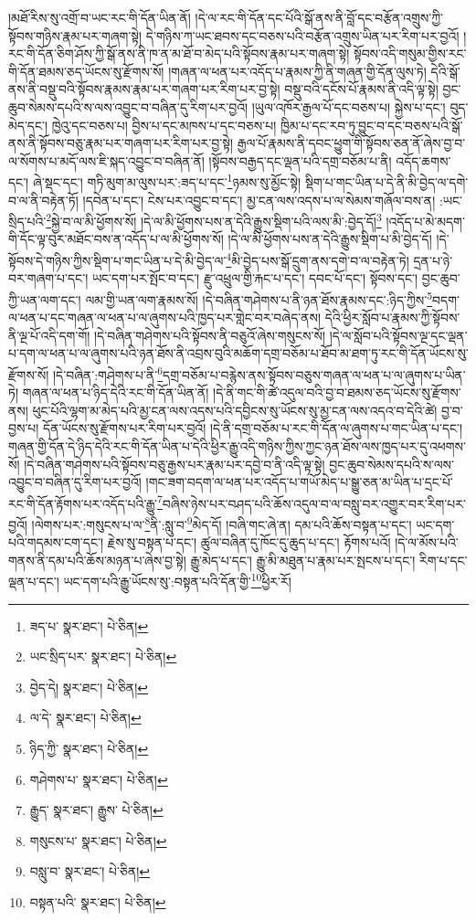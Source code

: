 །མཐོ་རིས་སུ་འགྲོ་བ་ཡང་རང་གི་དོན་ཡིན་ནོ། །དེ་ལ་རང་གི་དོན་དང་པོའི་སྒོ་ནས་ནི་བློ་དང་བརྩོན་འགྲུས་ཀྱི་སྟོབས་གཉིས་རྣམ་པར་གཞག་སྟེ། དེ་གཉིས་ཀ་ཡང་ཐབས་དང་བཅས་པའི་བརྩོན་འགྲུས་ཡིན་པར་རིག་པར་བྱའོ། །རང་གི་དོན་ཅིག་ཤོས་ཀྱི་སྒོ་ནས་ནི་ཁ་ན་མ་ཐོ་བ་མེད་པའི་སྟོབས་རྣམ་པར་གཞག་སྟེ། སྟོབས་འདི་གསུམ་གྱིས་རང་གི་དོན་ཐམས་ཅད་ཡོངས་སུ་རྫོགས་སོ། །གཞན་ལ་ཕན་པར་འདོད་པ་རྣམས་ཀྱི་ནི་གཞན་གྱི་དོན་ལུས་ཏེ། དེའི་སྒོ་ནས་ནི་བསྡུ་བའི་སྟོབས་རྣམས་རྣམ་པར་གཞག་པར་རིག་པར་བྱ་སྟེ། བསྡུ་བའི་དངོས་པོ་རྣམས་ནི་འདི་ལྟ་སྟེ། བྱང་ཆུབ་སེམས་དཔའི་ས་ལས་འབྱུང་བ་བཞིན་དུ་རིག་པར་བྱའོ། །ཡུལ་འཁོར་རྒྱལ་པོ་དང་བཅས་པ། སྐྱེས་པ་དང་། བུད་མེད་དང་། ཁྱེའུ་དང་བཅས་པ། བྱིས་པ་དང་མཁས་པ་དང་བཅས་པ། ཁྱིམ་པ་དང་རབ་ཏུ་བྱུང་བ་དང་བཅས་པའི་སྒོ་ནས་ནི་སྟོབས་བཅུ་རྣམ་པར་གཞག་པར་རིག་པར་བྱ་སྟེ། རྒྱལ་པོ་རྣམས་ནི་དབང་ཕྱུག་གི་སྟོབས་ཅན་ནོ་ཞེས་བྱ་བ་ལ་སོགས་པ་མདོ་ལས་ཇི་སྐད་འབྱུང་བ་བཞིན་ནོ། །སྟོབས་བརྒྱད་དང་ལྡན་པའི་དགྲ་བཅོམ་པ་ནི། འདོད་ཆགས་དང་། ཞེ་སྡང་དང་། གཏི་མུག་མ་ལུས་པར་:ཟད་པ་དང་\footnote{ཟད་པ་  སྣར་ཐང་།  པེ་ཅིན། }ཉམས་སུ་མྱོང་སྟེ། སྡིག་པ་གང་ཡིན་པ་དེ་ནི་མི་བྱེད་ལ་དགེ་བ་ལ་ནི་བརྟེན་ཏོ། །དབེན་པ་དང་། ངེས་པར་འབྱུང་བ་དང་། མྱ་ངན་ལས་འདས་པ་ལ་སེམས་གཞོལ་བས་ན། :ཡང་སྲིད་པའི་\footnote{ཡང་སྲིད་པར་  སྣར་ཐང་།  པེ་ཅིན། }སྐྱེ་བ་ལ་མི་ཕྱོགས་སོ། །དེ་ལ་མི་ཕྱོགས་པས་ན་དེའི་རྒྱུས་སྡིག་པའི་ལས་མི་:བྱེད་དོ།\footnote{བྱེད་དེ།  སྣར་ཐང་།  པེ་ཅིན། } །འདོད་པ་མེ་མདག་གི་དོང་ལྟ་བུར་མཐོང་བས་ན་འདོད་པ་ལ་མི་ཕྱོགས་སོ། །དེ་ལ་མི་ཕྱོགས་པས་ན་དེའི་རྒྱུས་སྡིག་པ་མི་བྱེད་དོ། །དེ་སྟོབས་དེ་གཉིས་ཀྱིས་སྡིག་པ་གང་ཡིན་པ་དེ་མི་བྱེད་ལ་\footnote{ལ་དེ་  སྣར་ཐང་།  པེ་ཅིན། }མི་བྱེད་པས་སྒོ་དྲུག་ནས་དགེ་བ་ལ་བརྟེན་ཏེ། དྲན་པ་ཉེ་བར་གཞག་པ་དང་། ཡང་དག་པར་སྤོང་བ་དང་། རྫུ་འཕྲུལ་གྱི་རྐང་པ་དང་། དབང་པོ་དང་། སྟོབས་དང་། བྱང་ཆུབ་ཀྱི་ཡན་ལག་དང་། ལམ་གྱི་ཡན་ལག་རྣམས་སོ། །དེ་བཞིན་གཤེགས་པ་ནི་ཉན་ཐོས་རྣམས་དང་:ཉིད་ཀྱིས་\footnote{ཉིད་ཀྱི་  སྣར་ཐང་།  པེ་ཅིན། }བདག་ལ་ཕན་པ་དང་གཞན་ལ་ཕན་པ་ལ་ཞུགས་པའི་ཁྱད་པར་གླེང་བར་བཞེད་ནས། དེའི་ཕྱིར་སློབ་པ་རྣམས་ཀྱི་སྟོབས་ནི་ལྔ་པོ་འདི་དག་གོ། །དེ་བཞིན་གཤེགས་པའི་སྟོབས་ནི་བཅུའོ་ཞེས་གསུངས་སོ། །དེ་ལ་སློབ་པའི་སྟོབས་ལྔ་དང་ལྡན་པ་དག་ལ་ཕན་པ་ལ་ཞུགས་པའི་ཉན་ཐོས་ནི་འབྲས་བུའི་མཆོག་དགྲ་བཅོམ་པ་ཐོབ་མ་ཐག་ཏུ་རང་གི་དོན་ཡོངས་སུ་རྫོགས་སོ། །དེ་བཞིན་:གཤེགས་པ་ནི་\footnote{གཤེགས་པ་  སྣར་ཐང་།  པེ་ཅིན། }དགྲ་བཅོམ་པ་བརྙེས་ནས་སྟོབས་བཅུས་གཞན་ལ་ཕན་པ་ལ་ཞུགས་པ་ཡིན་ཏེ། གཞན་ལ་ཕན་པ་ཉིད་དེའི་རང་གི་དོན་ཡིན་ནོ། །དེ་ནི་གང་གི་ཚེ་འདུལ་བའི་བྱ་བ་ཐམས་ཅད་ཡོངས་སུ་རྫོགས་ནས། ཕུང་པོའི་ལྷག་མ་མེད་པའི་མྱ་ངན་ལས་འདས་པའི་དབྱིངས་སུ་ཡོངས་སུ་མྱ་ངན་ལས་འདའ་བ་དེའི་ཚེ། བྱ་བ་བྱས་པ། དོན་ཡོངས་སུ་རྫོགས་པར་རིག་པར་བྱའོ། །དེ་ནི་དགྲ་བཅོམ་པ་རང་གི་དོན་ལ་ཞུགས་པ་གང་ཡིན་པ་དང་། གཞན་གྱི་དོན་དེ་ཉིད་དེའི་རང་གི་དོན་ཡིན་པ་དེའི་ཕྱིར་རྒྱུ་འདི་གཉིས་ཀྱིས་ཀྱང་ཉན་ཐོས་ལས་ཁྱད་པར་དུ་འཕགས་སོ། །དེ་བཞིན་གཤེགས་པའི་སྟོབས་བཅུ་རྒྱས་པར་རྣམ་པར་དབྱེ་བ་ནི་འདི་ལྟ་སྟེ། བྱང་ཆུབ་སེམས་དཔའི་ས་ལས་འབྱུང་བ་བཞིན་དུ་རིག་པར་བྱའོ། །གང་ཟག་བདག་ལ་ཕན་པར་འདོད་པ་གཡོ་མེད་པ་སྒྱུ་ཅན་མ་ཡིན་པ་དྲང་པོ་རང་གི་དོན་རྟོགས་པར་འདོད་པའི་རྒྱུ་\footnote{རྒྱུད་  སྣར་ཐང་། རྒྱུས་  པེ་ཅིན། }བཞིས་ཉེས་པར་བཤད་པའི་ཆོས་འདུལ་བ་ལ་བསླུ་བར་འགྱུར་བར་རིག་པར་བྱའོ། །ལེགས་པར་:གསུངས་པ་ལ་\footnote{གསུངས་པ་  སྣར་ཐང་།  པེ་ཅིན། }ནི་:སླུ་བ་\footnote{བསླུ་བ་  སྣར་ཐང་།  པེ་ཅིན། }མེད་དོ། །བཞི་གང་ཞེ་ན། དམ་པའི་ཆོས་བསྟན་པ་དང་། ཡང་དག་པའི་གདམས་ངག་དང་། རྗེས་སུ་བསྟན་པ་དང་། ཚུལ་བཞིན་དུ་ཁོང་དུ་ཆུད་པ་དང་། རྟོགས་པའོ། །དེ་ལ་མོས་པའི་གནས་ནི་དམ་པའི་ཆོས་མཉན་པ་ཞེས་བྱ་སྟེ། རྒྱུ་མེད་པ་དང་། རྒྱུ་མི་མཐུན་པ་རྣམ་པར་སྤངས་པ་དང་། རིག་པ་དང་ལྡན་པ་དང་། ཡང་དག་པའི་རྒྱུ་ཡོངས་སུ་:བསྟན་པའི་དོན་གྱི་\footnote{བསྟན་པའི་  སྣར་ཐང་།  པེ་ཅིན། }ཕྱིར་རོ། 
